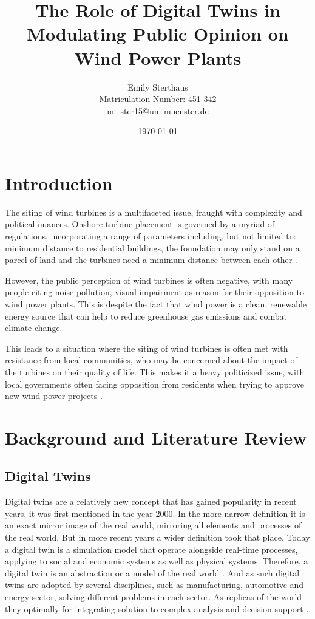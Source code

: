 \documentclass[11pt, titlepage, a4paper]{article}
\title{The Role of Digital Twins in Modulating Public Opinion on Wind Power Plants}
\author{Emily Sterthaus \\ Matriculation Number: 451 342 \\ \href{mailto:m_ster15@uni-muenster.de}{m\_ster15@uni-muenster.de}}
\affil{Institute of Geoinformatics, University of Münster}
\date{\today}
\begin{document}
\maketitle


\newpage
\tableofcontents
\newpage
\begin{linenumbers}
    \section{Introduction}
    The siting of wind turbines is a multifaceted issue, fraught with complexity and political nuances. Onshore
    turbine placement is governed by a myriad of regulations, incorporating a range of parameters including, but not
    limited to: minimum distance to residential buildings, the foundation may only stand on a parcel of land and the
    turbines need a minimum distance between each other
    \cite{niedersachsischesministeriumfurumweltenergieundklimaschutzPlanungUndGenehmigung2021}.

    However, the public perception of wind turbines is often negative, with many people citing noise pollution, visual impairment as reason for their opposition to wind power plants. This is despite the fact that wind power is a clean, renewable energy source that can help to reduce greenhouse gas emissions and combat climate change.

    This leads to a situation where the siting of wind turbines is often met with resistance from local communities, who may be concerned about the impact of the turbines on their quality of life. This makes it a heavy politicized issue, with local governments often facing opposition from residents when trying to approve new wind power projects \cite{kwasniewskiWindenergieVerhindertAntiWindkraftBewegung2021}.


    \section{Background and Literature Review}
    \subsection{Digital Twins}
    Digital twins are a relatively new concept that has gained popularity in recent years, it was first  mentioned in the year 2000. In the more narrow definition it is an exact mirror image of the real world, mirroring all elements and processes of the real world. But in more recent years a wider definition took that place. Today a digital twin is a simulation model that operate alongside real-time processes, applying to social and economic systems as well as physical systems. Therefore, a digital twin is an abstraction or a model of the real world \cite{battyDigitalTwins2018}.
    And as such digital twins are adopted by several disciplines, such as manufacturing, automotive and energy sector, solving different problems in each sector. As replicas of the world they optimally for integrating solution to complex analysis and decision support \cite{pylianidisIntroducingDigitalTwins2021}.

\end{linenumbers}
\end{document}
